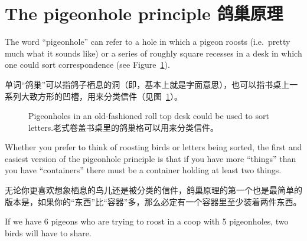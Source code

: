 
\clearpage





\clearpage


\section{The pigeonhole principle 鸽巢原理}
\label{sec:pigeonhole}

The word  ``pigeonhole'' can refer to a hole in which a pigeon roosts
(i.e.\ pretty much what it sounds like) or a series of roughly square 
recesses in a desk in which one could sort correspondence (see Figure~\ref{fig:roll_top}).

单词“鸽巢”可以指鸽子栖息的洞（即，基本上就是字面意思），也可以指书桌上一系列大致方形的凹槽，用来分类信件（见图~\ref{fig:roll_top}）。

\begin{figure}[!hbtp]
\begin{center}

\end{center}
\caption[A desk with pigeonholes.带鸽巢格的书桌。]{Pigeonholes in an old-fashioned roll top
desk could be used to sort letters.老式卷盖书桌里的鸽巢格可以用来分类信件。}
\label{fig:roll_top} 
\end{figure}

Whether you prefer to think of roosting birds or letters being sorted,
the first and easiest version of the  pigeonhole principle is that if you
have more ``things'' than you have ``containers'' there must be a container
holding at least two things.

无论你更喜欢想象栖息的鸟儿还是被分类的信件，鸽巢原理的第一个也是最简单的版本是，如果你的“东西”比“容器”多，那么必定有一个容器里至少装着两件东西。

If we have 6 pigeons who are trying to roost in a coop with 5 pigeonholes,
two birds will have to share.

